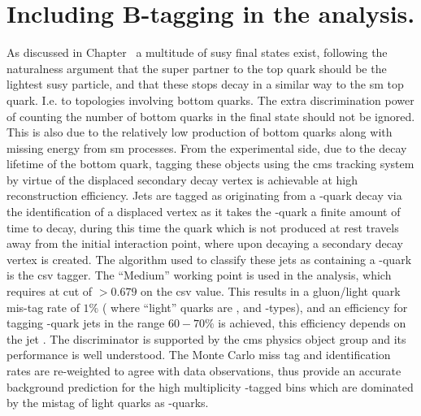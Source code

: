
\section{Including B-tagging in the \alt analysis.} %
\label{sec:extension_to_higher_analysis_dimensions_}


As discussed in Chapter~\label{cha:theory} a multitude of \ac{susy} final states exist, following the naturalness argument that the super partner to the top quark should be the lightest \ac{susy} particle, and that these stops decay in a similar way to the \ac{sm} top quark. I.e. to topologies involving bottom quarks. The extra discrimination power of counting the number of bottom quarks in the final state should not be ignored. This is also due to the relatively low production of bottom quarks along with missing energy from \ac{sm} processes. From the experimental side, due to the decay lifetime of the bottom quark, tagging these objects using the \ac{cms} tracking system by virtue of the displaced secondary decay vertex is achievable at high reconstruction efficiency. 
Jets are tagged as originating from a \Pbottom-quark decay via the identification of a displaced vertex as it takes the \Pbottom-quark a finite amount of time to decay, during this time the quark which is not produced at rest travels away from the initial interaction point, where upon decaying a secondary decay vertex is created. The algorithm used to classify these jets as containing a \Pbottom-quark is the \ac{csv} tagger. The ``Medium'' working point is used in the analysis, which requires at cut of $>0.679$ on the \ac{csv} value. This results in a gluon/light quark mis-tag rate of $1\%$ ( where ``light'' quarks are \Pup, \Pdown and \Pstrange-types), and an efficiency for tagging \Pbottom-quark jets in the range $60-70\%$ is achieved, this efficiency depends on the jet \PT. The discriminator is supported by the \ac{cms} \Pbottom physics object group and its performance is well understood. The Monte Carlo miss tag and identification rates are re-weighted to agree with data observations, thus provide an accurate background prediction for the high multiplicity \Pbottom-tagged bins which are dominated by the mistag of light quarks as \Pbottom-quarks.



